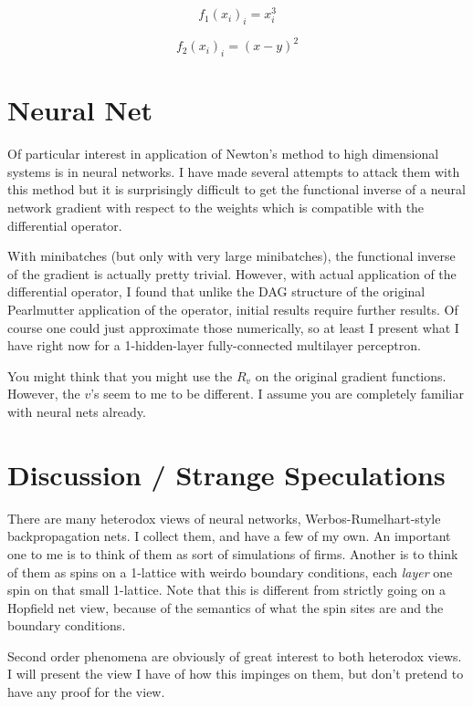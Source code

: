 \documentclass{article}
\begin{document}
$$ f_1(x_i)_i = x_i^3 $$


$$ f_2(x_i)_i = (x -y) ^ 2 $$

\section{Neural Net}

Of particular interest in application of Newton's method to high dimensional systems is in neural networks. I have made several attempts to attack them with this method but it is surprisingly difficult to get the functional inverse of a neural network gradient with respect to the weights which is compatible with the differential operator.

With minibatches (but only with very large minibatches), the functional inverse of the gradient is actually pretty trivial. However, with actual application of the differential operator, I found that unlike the DAG structure of the original Pearlmutter application of the operator, initial results require further results. Of course one could just approximate those numerically, so at least I present what I have right now for a 1-hidden-layer fully-connected multilayer perceptron.

You might think that you might use the $R_v$ on the original gradient functions. However, the $v$'s seem to me to be different. I assume you are completely familiar with neural nets already.


\section{Discussion / Strange Speculations}

There are many heterodox views of neural networks, Werbos-Rumelhart-style backpropagation nets. I collect them, and have a few of my own. An important one to me is to think of them as sort of simulations of firms. Another is to think of them as spins on a 1-lattice with weirdo boundary conditions, each \textit{layer} one spin on that small 1-lattice. Note that this is different from strictly going on a Hopfield net view, because of the semantics of what the spin sites are and the boundary conditions.

Second order phenomena are obviously of great interest to both heterodox views. I will present the view I have of how this impinges on them, but don't pretend to have any proof for the view.
\end{document}
